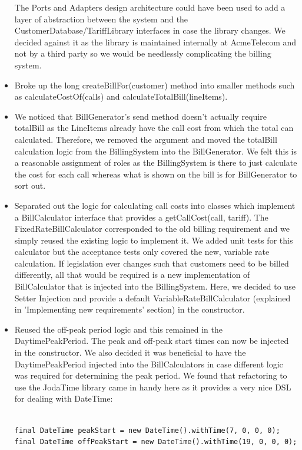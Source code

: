 \documentclass[a4paper,11pt]{article}
\begin{document}
\begin{itemize}
The Ports and Adapters design architecture could have been used to add a layer of abstraction between the system and the CustomerDatabase/TariffLibrary interfaces in case the library changes. We decided against it as the library is maintained internally at AcmeTelecom and not by a third party so we would be needlessly complicating the billing system.
\item Broke up the long createBillFor(customer) method into smaller methods such as calculateCostOf(calls) and calculateTotalBill(lineItems).
\item We noticed that BillGenerator's send method doesn't actually require totalBill as the LineItems already have the call cost from which the total can calculated. Therefore, we removed the argument and moved the totalBill calculation logic from the BillingSystem into the BillGenerator. We felt this is a reasonable assignment of roles as the BillingSystem is there to just calculate the cost for each call whereas what is shown on the bill is for BillGenerator to sort out.
\item Separated out the logic for calculating call costs into classes which implement a BillCalculator interface that provides a getCallCost(call, tariff). The FixedRateBillCalculator corresponded to the old billing requirement and we simply reused the existing logic to implement it. We added unit tests for this calculator but the acceptance tests only covered the new, variable rate calculation. If legislation ever changes such that customers need to be billed differently, all that would be required is a new implementation of BillCalculator that is injected into the BillingSystem. Here, we decided to use Setter Injection and provide a default VariableRateBillCalculator (explained in 'Implementing new requirements' section) in the constructor.
\item Reused the off-peak period logic and this remained in the DaytimePeakPeriod. The peak and off-peak start times can now be injected in the constructor. We also decided it was beneficial to have the DaytimePeakPeriod injected into the BillCalculators in case different logic was required for determining the peak period. We found that refactoring to use the JodaTime library came in handy here as it provides a very nice DSL for dealing with DateTime:
\\\\

\begin{lstlisting}[caption=The new offPeak(DateTime time) method showing the usage of the DSL provided by JodaTime]
final DateTime peakStart = new DateTime().withTime(7, 0, 0, 0);
final DateTime offPeakStart = new DateTime().withTime(19, 0, 0, 0);


\end{lstlisting}
\end{itemize}
\end{document}
